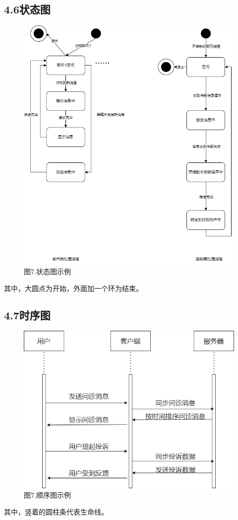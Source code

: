 \documentclass[24pt,a4paper]{article}%
\begin{document}
\subsection*{\songti 4.6状态图}
\begin{figure}[H]
    \centering
    \includegraphics[width=1\textwidth]{images/state.png}
    \caption*{图7.状态图示例}
\end{figure}
其中，大圆点为开始，外面加一个环为结束。
\subsection*{\songti 4.7时序图}
\begin{figure}[H]
    \centering
    \includegraphics[width=1\textwidth]{images/time.png}
    \caption*{图7.顺序图示例}
\end{figure}
其中，竖着的圆柱条代表生命线。
\end{document}
